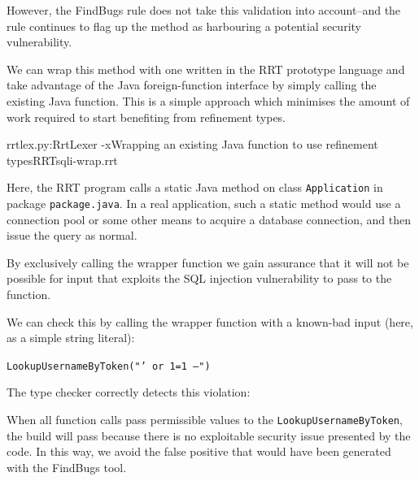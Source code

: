 \documentclass[a4paper,openany,12pt]{book}
\begin{document}


However, the FindBugs rule does not take this validation into account--and the rule continues to flag up the method
as harbouring a potential security vulnerability.

We can wrap this method with one written in the RRT prototype language and take advantage of the Java foreign-function
interface by simply calling the existing Java function.
This is a simple approach which minimises the amount of work required to start benefiting from refinement types.

\begin{mycodefile}{rrtlex.py:RrtLexer -x}{Wrapping an existing Java function to use refinement types}{RRT}{sqli-wrap.rrt}
    \vspace{0.5em}

    Here, the RRT program calls a static Java method on class \texttt{Application} in package \texttt{package.java}.
    In a real application, such a static method would use a connection pool or some other means to acquire a
    database connection, and then issue the query as normal.
\end{mycodefile}

By exclusively calling the wrapper function we gain assurance that it will not be possible for input that exploits
the SQL injection vulnerability to pass to the function.

We can check this by calling the wrapper function with a known-bad input (here, as a simple string literal):

\texttt{LookupUsernameByToken("' or 1=1 --")}

The type checker correctly detects this violation:


When all function calls pass permissible values to the \texttt{LookupUsernameByToken}, the build will pass because
there is no exploitable security issue presented by the code.
In this way, we avoid the false positive that would have been generated with the FindBugs tool.
\end{document}
